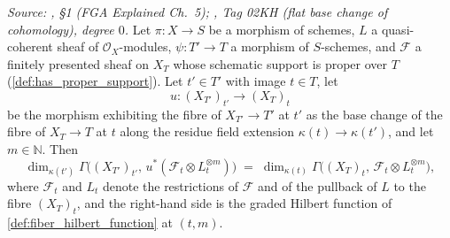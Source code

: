 \begin{lemma}\leanok
  \label{lem:gamma_fiber_baseChange_field}
  \textit{Source: \cite{nitsure-hilbert-quot}, \S 1 (FGA Explained Ch.~5); \cite{stacks-project},
  Tag 02KH (flat base change of cohomology), degree \(0\).}
  Let \(\pi : X \to S\) be a morphism of schemes, \(L\) a quasi-coherent
  sheaf of \(\mathcal{O}_X\)-modules, \(\psi : T' \to T\) a morphism of
  \(S\)-schemes, and \(\mathcal{F}\) a finitely presented sheaf on \(X_T\)
  whose schematic support is proper over \(T\)
  (\cref{def:has_proper_support}).  Let \(t' \in T'\) with image
  \(t \in T\), let
  \[
    u : (X_{T'})_{t'} \longrightarrow (X_T)_t
  \]
  be the morphism exhibiting the fibre of \(X_{T'} \to T'\) at \(t'\) as the
  base change of the fibre of \(X_T \to T\) at \(t\) along the residue field
  extension \(\kappa(t) \to \kappa(t')\), and let \(m \in \mathbb{N}\).
  Then
  \[
    \dim_{\kappa(t')} \Gamma\bigl((X_{T'})_{t'},\,
      u^*(\mathcal{F}_t \otimes L_t^{\otimes m})\bigr)
    \;=\;
    \dim_{\kappa(t)} \Gamma\bigl((X_T)_t,\,
      \mathcal{F}_t \otimes L_t^{\otimes m}\bigr),
  \]
  where \(\mathcal{F}_t\) and \(L_t\) denote the restrictions of
  \(\mathcal{F}\) and of the pullback of \(L\) to the fibre \((X_T)_t\), and
  the right-hand side is the graded Hilbert function of
  \cref{def:fiber_hilbert_function} at \((t, m)\).
\end{lemma}
